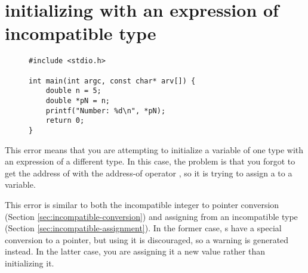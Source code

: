 \section{initializing with an expression of incompatible type}\label{sec:incompatible-initializing}

\begin{figure}
\begin{lstlisting}
#include <stdio.h>

int main(int argc, const char* arv[]) {
	double n = 5;
	double *pN = n;
	printf("Number: %d\n", *pN);
	return 0;
}
\end{lstlisting}
\label{ex:incompatible-initializing}
\end{figure}

This error means that you are attempting to initialize a variable of one type with an expression of a different type.
In this case, the problem is that you forgot to get the address of  with the address-of operator \code{\&}, so it is trying to assign a  to a  variable.

This error is similar to both the incompatible integer to pointer conversion (Section \ref{sec:incompatible-conversion}) and assigning from an incompatible type (Section \ref{sec:incompatible-assignment}).
In the former case, s have a special conversion to a pointer, but using it is discouraged, so a warning is generated instead.
In the latter case, you are assigning it a new value rather than initializing it.

\newpage